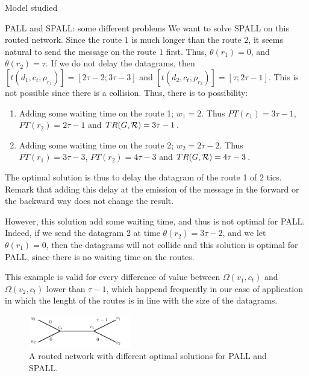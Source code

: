 \documentclass[10pt]{article}
\newcommand\pall{\textsc{PALL}\xspace}
\newcommand\spall{\textsc{SPALL}\xspace}
\begin{document}
\begin{section}{Model studied }
\begin{subsection}{\pall and \spall: some different problems}
  We want to solve \spall on this routed network. Since the route $1$ is much longer than the route $2$, it seems natural to send the message on the route $1$ first. Thus, $\theta(r_1) = 0$, and $\theta (r_2) = \tau $. If we do not delay the datagrams, then $[t(d_1,c_t,\rho_{r_1})] = [2\tau -2;3\tau-3]$ and $[t(d_2,c_t,\rho_{r_2})] = [\tau;2\tau-1]$. This is not possible since there is a collision. 
  Thus, there is to possibility: 
  \begin{enumerate}
                                                                                                                                                                                                                                                                                                                                                                                                                                               \item Adding some waiting time on the route 1; $w_1 = 2$. Thus $PT(r_1) = 3\tau-1$, $PT(r_2) = 2\tau -1$ and $TR(G,{\cal R}) =3\tau-1$. 
\item Adding some waiting time on the route 2; $w_2 = 2\tau-2$. Thus $PT(r_1) = 3\tau-3$, $PT(r_2) = 4\tau -3$ and $TR(G,{\cal R}) = 4\tau-3$.                                                                                                                                                                                                                                                             \end{enumerate}
The optimal solution is thus to delay the datagram of the route 1 of $2$ tics. Remark that adding this delay at the emission of the message in the forward or the backward way does not change the result.

However, this solution add some waiting time, and thus is not optimal for \pall. Indeed, if we send the datagram $2$ at time  $\theta (r_2) = 3\tau-2 $, and we let $\theta(r_1) = 0$, then the datagrams will not collide and this solution is optimal for \pall, since there is no waiting time on the routes.

This example is valid for every difference of value between $\Omega(v_1,c_t)$ and $\Omega(v_2,c_t)$ lower than $\tau -1$, which happend frequently in our case of application in which the lenght of the routes is in line with the size of the datagrams.

  \begin{figure}
  \begin{center}
 \includegraphics[width=0.4\textwidth]{examplestar}
\caption{A routed network with different optimal solutions for PALL and SPALL.}\label{fig:pallpallexample}
\end{center}
\end{figure}
  
    \end{subsection}
  \end{section}
\end{document}
